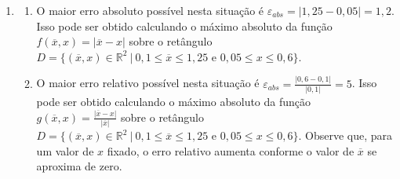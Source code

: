 \documentclass[12pt,a4paper]{article}
\newcommand*\R{\mathbb{R}}
\begin{document}
\begin{enumerate}
\item
\begin{enumerate}
\item O maior erro absoluto possível nesta situação é $\varepsilon_{abs} = |1,25 - 0,05| = 1,2$. Isso pode ser obtido calculando o máximo absoluto da função $f(\overline{x}, x) = |\overline{x} - x|$ sobre o retângulo $D = \{ (\overline{x}, x) \in \R^2 \ |\ 0,1 \leq \overline{x} \leq 1,25 \text{ e } 0,05 \leq x \leq 0,6 \}$.

\item O maior erro relativo possível nesta situação é $\varepsilon_{abs} = \frac{|0,6 - 0,1| }{ |0,1|} = 5$. Isso pode ser obtido calculando o máximo absoluto da função $g(\overline{x}, x) = \frac{|\overline{x}-x| }{ |\overline{x}|}$ sobre o retângulo $D = \{ (\overline{x}, x) \in \R^2 \ |\ 0,1 \leq \overline{x} \leq 1,25 \text{ e } 0,05 \leq x \leq 0,6 \}$. Observe que, para um valor de $x$ fixado, o erro relativo aumenta conforme o valor de $\overline{x}$ se aproxima de zero.
\end{enumerate}


\end{enumerate}
\end{document}
